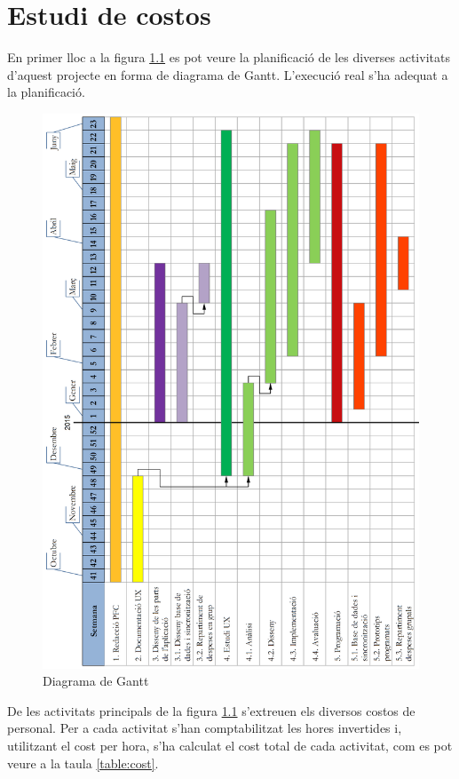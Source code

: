 \chapter{Estudi de costos}
En primer lloc a la figura \ref{fig:gantt} es pot veure la planificació de les diverses activitats d'aquest projecte en forma de diagrama de Gantt. L'execució real s'ha adequat a la planificació.

\begin{figure}[ht]
\centering
\includegraphics[scale=0.8]{Gantt.png}
\caption{Diagrama de Gantt}\label{fig:gantt}
\end{figure}

De les activitats principals de la figura \ref{fig:gantt} s'extreuen els diversos costos de personal. Per a cada activitat s'han comptabilitzat les hores invertides i, utilitzant el cost per hora, s'ha calculat el cost total de cada activitat, com es pot veure a la taula \ref{table:cost}. 

